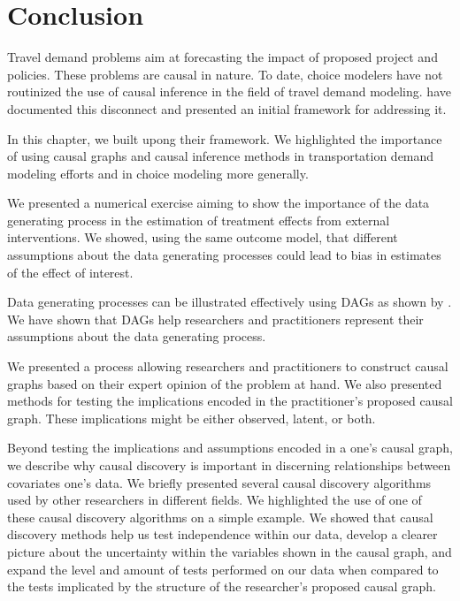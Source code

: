 \section{Conclusion}
\label{sec:conclusion}

Travel demand problems aim at forecasting the impact of proposed project and policies. These problems are causal in nature. 
To date, choice modelers have not routinized the use of causal inference in the field of travel demand modeling.
\citet{brathwaite_2018_causal} have documented this disconnect and presented an initial framework for addressing it.

In this chapter, we built upong their framework.
We highlighted the importance of using causal graphs and causal inference methods in transportation demand modeling efforts and in choice modeling more generally.

We presented a numerical exercise aiming to show the importance of  the data generating process in the estimation 
of treatment effects from external interventions. 
We showed, using the same outcome model, that different assumptions about the data generating processes could 
lead to bias in estimates of the effect of interest.

Data generating processes can be illustrated effectively using DAGs as shown by \citet{pearl_1995_causal}.
We have shown that DAGs help researchers and practitioners represent their assumptions about the data generating process. 

We presented a process allowing researchers and practitioners to construct causal graphs based on their expert opinion of the problem at hand. 
We also presented methods for testing the implications encoded in the practitioner's proposed causal graph. 
These implications might be either observed, latent, or both.

Beyond testing the implications and assumptions encoded in a one's causal graph, we describe why causal discovery is important in discerning relationships between covariates one's data.
We briefly presented several causal discovery algorithms used by
other researchers in different fields. 
We highlighted the use of one of these causal discovery algorithms on a simple example. 
We showed that causal discovery methods help us test independence within our data, 
develop a clearer picture about the uncertainty within the variables shown in the causal graph, 
and expand the level and amount of tests performed on our data when compared to the tests implicated 
by the structure of the researcher's proposed causal graph.

